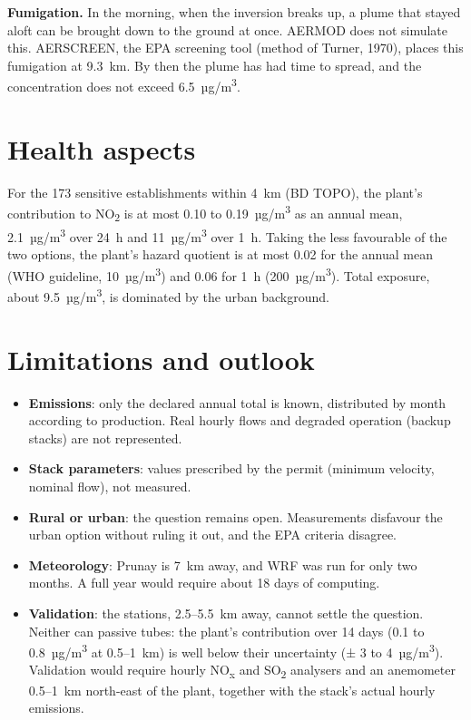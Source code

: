 \documentclass[11pt,a4paper]{article}
\newcommand{\NOx}{NO\textsubscript{x}}
\newcommand{\NOd}{NO\textsubscript{2}}
\newcommand{\SOd}{SO\textsubscript{2}}
\newcommand{\ugm}{µg/m\textsuperscript{3}}
\begin{document}
\textbf{Fumigation.} In the morning, when the inversion breaks up, a plume that stayed aloft can be brought down to
the ground at once. AERMOD does not simulate this. AERSCREEN, the EPA screening tool (method of Turner, 1970), places
this fumigation at 9.3~km. By then the plume has had time to spread, and the concentration does not exceed
6.5~\ugm.

\section{Health aspects}
For the 173 sensitive establishments within 4~km (BD TOPO), the plant's contribution to \NOd{} is at most 0.10 to
0.19~\ugm{} as an annual mean, 2.1~\ugm{} over 24~h and 11~\ugm{} over 1~h. Taking the less favourable of the two
options, the plant's hazard quotient is at most 0.02 for the annual mean (WHO guideline, 10~\ugm) and 0.06 for 1~h
(200~\ugm). Total exposure, about 9.5~\ugm, is dominated by the urban background.

\section{Limitations and outlook}
\begin{itemize}
\item \textbf{Emissions}: only the declared annual total is known, distributed by month according to production. Real
hourly flows and degraded operation (backup stacks) are not represented.
\item \textbf{Stack parameters}: values prescribed by the permit (minimum velocity, nominal flow), not measured.
\item \textbf{Rural or urban}: the question remains open. Measurements disfavour the urban option without ruling it
out, and the EPA criteria disagree.
\item \textbf{Meteorology}: Prunay is 7~km away, and WRF was run for only two months. A full year would require about
18 days of computing.
\item \textbf{Validation}: the stations, 2.5–5.5~km away, cannot settle the question. Neither can passive tubes: the
plant's contribution over 14 days (0.1 to 0.8~\ugm{} at 0.5–1~km) is well below their uncertainty (± 3 to
4~\ugm). Validation would require hourly \NOx{} and \SOd{} analysers and an anemometer 0.5–1~km north-east of the
plant, together with the stack's actual hourly emissions.
\end{itemize}
\end{document}
